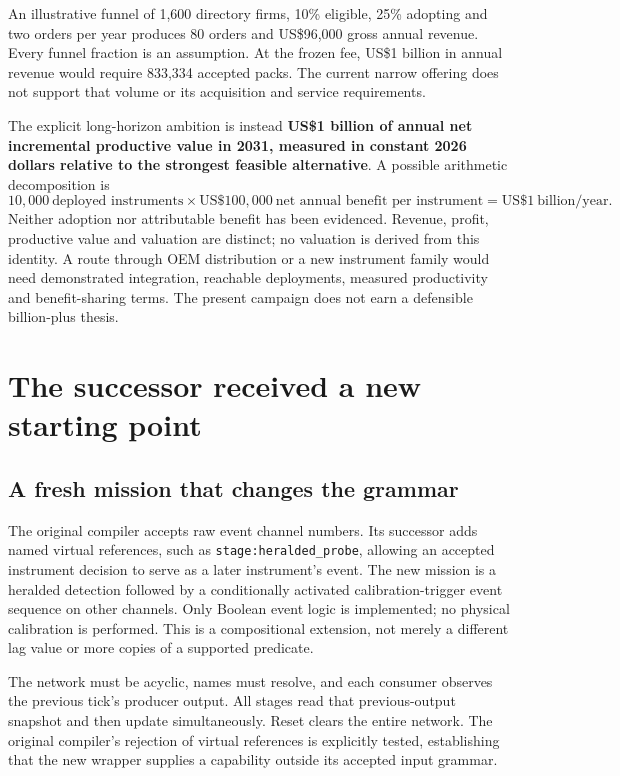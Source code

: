 An illustrative funnel of 1,600 directory firms, 10\% eligible, 25\% adopting and two orders per year produces 80 orders and US\$96,000 gross annual revenue. Every funnel fraction is an assumption. At the frozen fee, US\$1 billion in annual revenue would require 833,334 accepted packs. The current narrow offering does not support that volume or its acquisition and service requirements.

The explicit long-horizon ambition is instead \textbf{US\$1 billion of annual net incremental productive value in 2031, measured in constant 2026 dollars relative to the strongest feasible alternative}. A possible arithmetic decomposition is
\begin{equation}
10{,}000\ \text{deployed instruments}\times
\mathrm{US}\$100{,}000\ \text{net annual benefit per instrument}
=\mathrm{US}\$1\ \text{billion/year}.
\end{equation}
Neither adoption nor attributable benefit has been evidenced. Revenue, profit, productive value and valuation are distinct; no valuation is derived from this identity. A route through OEM distribution or a new instrument family would need demonstrated integration, reachable deployments, measured productivity and benefit-sharing terms. The present campaign does not earn a defensible billion-plus thesis.

\section{The successor received a new starting point}
\subsection{A fresh mission that changes the grammar}
The original compiler accepts raw event channel numbers. Its successor adds named virtual references, such as \texttt{stage:heralded\_probe}, allowing an accepted instrument decision to serve as a later instrument's event. The new mission is a heralded detection followed by a conditionally activated calibration-trigger event sequence on other channels. Only Boolean event logic is implemented; no physical calibration is performed. This is a compositional extension, not merely a different lag value or more copies of a supported predicate.

The network must be acyclic, names must resolve, and each consumer observes the previous tick's producer output. All stages read that previous-output snapshot and then update simultaneously. Reset clears the entire network. The original compiler's rejection of virtual references is explicitly tested, establishing that the new wrapper supplies a capability outside its accepted input grammar.

